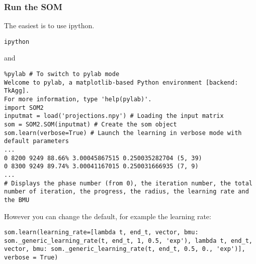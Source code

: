 \begin{frame}[fragile]
    \frametitle{Run the SOM}
    \footnotesize
    The easiest is to use ipython.
    \begin{lstlisting}
ipython
    \end{lstlisting}
    and
    \begin{lstlisting}
%pylab # To switch to pylab mode
Welcome to pylab, a matplotlib-based Python environment [backend: TkAgg].
For more information, type 'help(pylab)'.
import SOM2
inputmat = load('projections.npy') # Loading the input matrix
som = SOM2.SOM(inputmat) # Create the som object
som.learn(verbose=True) # Launch the learning in verbose mode with default parameters
...
0 8200 9249 88.66% 3.00045867515 0.250035282704 (5, 39)
0 8300 9249 89.74% 3.00041167015 0.250031666935 (7, 9)
...
# Displays the phase number (from 0), the iteration number, the total number of iteration, the progress, the radius, the learning rate and the BMU
    \end{lstlisting}
However you can change the default, for example the learning rate:
\begin{lstlisting}[basicstyle=\tiny]
som.learn(learning_rate=[lambda t, end_t, vector, bmu: som._generic_learning_rate(t, end_t, 1, 0.5, 'exp'), lambda t, end_t, vector, bmu: som._generic_learning_rate(t, end_t, 0.5, 0., 'exp')], verbose = True)
    \end{lstlisting}
\end{frame}
